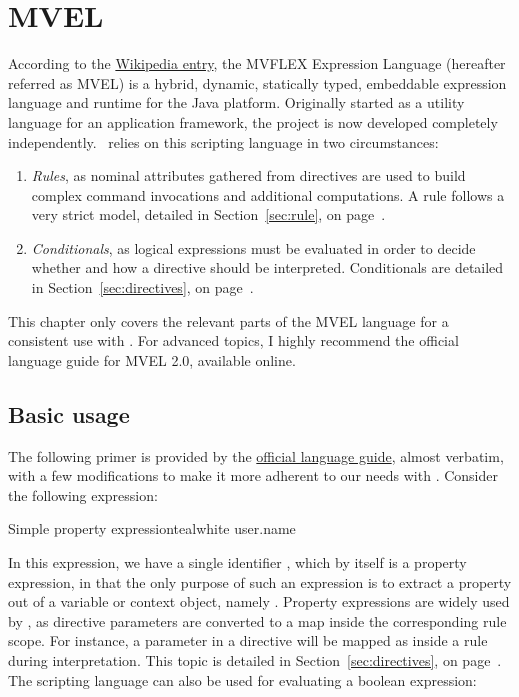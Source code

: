 \chapter{MVEL}
\label{chap:mvel}

According to the \href{https://en.wikipedia.org/wiki/MVEL}{Wikipedia entry}, the MVFLEX Expression Language (hereafter referred as \gls{MVEL}) is a hybrid, dynamic, statically typed, embeddable expression language and runtime for the Java platform. Originally started as a utility language for an application framework, the project is now developed completely independently. \arara\ relies on this scripting language in two circumstances:

\begin{enumerate}
\item\emph{Rules}, as nominal attributes gathered from directives are used to build complex command invocations and additional computations. A rule follows a very strict model, detailed in Section~\ref{sec:rule}, on page~\pageref{sec:rule}.

\item\emph{Conditionals}, as logical expressions must be evaluated in order to decide whether and how a directive should be interpreted. Conditionals are detailed in Section~\ref{sec:directives}, on page~\pageref{sec:directives}.
\end{enumerate}

This chapter only covers the relevant parts of the \gls{MVEL} language for a consistent use with \arara. For advanced topics, I highly recommend the official language guide for \gls{MVEL} 2.0, available online.

\section{Basic usage}
\label{sec:mvelbasicusage}

The following primer is provided by the \href{https://mvel.documentnode.com/}{official language guide}, almost verbatim, with a few modifications to make it more adherent to our needs with \arara. Consider the following expression:

\begin{codebox}{Simple property expression}{teal}{\icnote}{white}
user.name
\end{codebox}

In this expression, we have a single identifier , which by itself is a property expression, in that the only purpose of such an expression is to extract a property out of a variable or context object, namely . Property expressions are widely used by \arara, as directive parameters are converted to a map inside the corresponding rule scope. For instance, a parameter  in a directive will be mapped as  inside a rule during interpretation. This topic is detailed in Section~\ref{sec:directives}, on page~\pageref{sec:directives}. The scripting language can also be used for evaluating a boolean expression:


